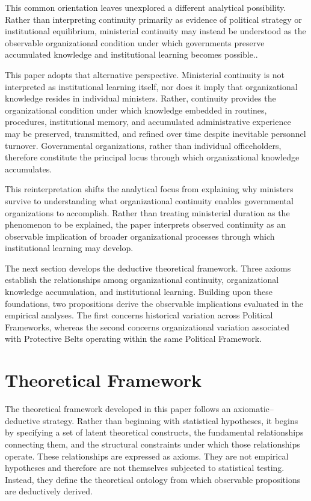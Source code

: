 \documentclass[doc, 12pt, a4paper,floatsintext]{apa7}
\begin{document}
This common orientation leaves unexplored a different analytical possibility. Rather than interpreting continuity primarily as evidence of political strategy or institutional equilibrium, ministerial continuity may instead be understood as the observable organizational condition under which governments preserve accumulated knowledge and institutional learning becomes possible..

This paper adopts that alternative perspective. Ministerial continuity is not interpreted as institutional learning itself, nor does it imply that organizational knowledge resides in individual ministers. Rather, continuity provides the organizational condition under which knowledge embedded in routines, procedures, institutional memory, and accumulated administrative experience may be preserved, transmitted, and refined over time despite inevitable personnel turnover. Governmental organizations, rather than individual officeholders, therefore constitute the principal locus through which organizational knowledge accumulates.

This reinterpretation shifts the analytical focus from explaining why ministers survive to understanding what organizational continuity enables governmental organizations to accomplish. Rather than treating ministerial duration as the phenomenon to be explained, the paper interprets observed continuity as an observable implication of broader organizational processes through which institutional learning may develop.

The next section develops the deductive theoretical framework. Three axioms establish the relationships among organizational continuity, organizational knowledge accumulation, and institutional learning. Building upon these foundations, two propositions derive the observable implications evaluated in the empirical analyses. The first concerns historical variation across Political Frameworks, whereas the second concerns organizational variation associated with Protective Belts operating within the same Political Framework.

%
%
\section{Theoretical Framework}
\label{sec:theoretical_framework}
%

The theoretical framework developed in this paper follows an axiomatic--deductive strategy. Rather than beginning with statistical hypotheses, it begins by specifying a set of latent theoretical constructs, the fundamental relationships connecting them, and the structural constraints under which those relationships operate. These relationships are expressed as axioms. They are not empirical hypotheses and therefore are not themselves subjected to statistical testing. Instead, they define the theoretical ontology from which observable propositions are deductively derived.
\end{document}

